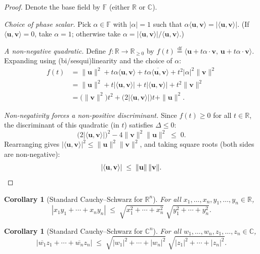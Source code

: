 \documentclass[11pt, a4paper, notitlepage]{report}
\newtheorem{corollary}[theorem]{Corollary}
\theoremstyle{definition}
\theoremstyle{remark}
\begin{document}
\begin{proof}
Denote the base field by $\mathbb{F}$ (either $\mathbb{R}$ or $\mathbb{C}$).

\medskip
\textit{Choice of phase scalar.}
Pick $\alpha \in \mathbb{F}$ with $|\alpha| = 1$ such that $\alpha\langle\mathbf{u},\mathbf{v}\rangle = |\langle\mathbf{u},\mathbf{v}\rangle|$.
(If $\langle\mathbf{u},\mathbf{v}\rangle = 0$, take $\alpha = 1$; otherwise take
$\alpha = |\langle\mathbf{u},\mathbf{v}\rangle|/\langle\mathbf{u},\mathbf{v}\rangle$.)

\medskip
\textit{A non-negative quadratic.}
Define $f : \mathbb{R} \to \mathbb{R}_{\geq 0}$ by
$f(t) \stackrel{\mathrm{df}}{=} \langle\mathbf{u}+t\alpha\cdot\mathbf{v},\,\mathbf{u}+t\alpha\cdot\mathbf{v}\rangle$.
Expanding using (bi/sesqui)linearity and the choice of $\alpha$:
\begin{align*}
  f(t) &= \|\mathbf{u}\|^2 + t\alpha\langle\mathbf{u},\mathbf{v}\rangle
           + t\overline{\alpha\langle\mathbf{u},\mathbf{v}\rangle}
           + t^2|\alpha|^2\|\mathbf{v}\|^2 \\
       &= \|\mathbf{u}\|^2 + t|\langle\mathbf{u},\mathbf{v}\rangle|
           + t|\langle\mathbf{u},\mathbf{v}\rangle|
           + t^2\|\mathbf{v}\|^2 \\
       &= \bigl(\|\mathbf{v}\|^2\bigr)t^2
          + \bigl(2|\langle\mathbf{u},\mathbf{v}\rangle|\bigr)t
          + \|\mathbf{u}\|^2.
\end{align*}

\medskip
\textit{Non-negativity forces a non-positive discriminant.}
Since $f(t) \geq 0$ for all $t \in \mathbb{R}$, the discriminant of this quadratic
(in $t$) satisfies $\Delta \leq 0$:
\[
  \bigl(2|\langle\mathbf{u},\mathbf{v}\rangle|\bigr)^2
  - 4\|\mathbf{v}\|^2\|\mathbf{u}\|^2 \;\leq\; 0.
\]
Rearranging gives $|\langle\mathbf{u},\mathbf{v}\rangle|^2 \leq \|\mathbf{u}\|^2\|\mathbf{v}\|^2$,
and taking square roots (both sides are non-negative):
\[
  |\langle\mathbf{u},\mathbf{v}\rangle| \;\leq\; \|\mathbf{u}\|\,\|\mathbf{v}\|. \qedhere
\]
\end{proof}

\begin{corollary}[Standard Cauchy--Schwarz for $\mathbb{R}^n$]
\label{cor:cs-Rn}
For all $x_1,\ldots,x_n,y_1,\ldots,y_n\in\mathbb{R}$,
\[
  |x_1 y_1 + \cdots + x_n y_n|
  \;\leq\; \sqrt{x_1^2+\cdots+x_n^2}\;\sqrt{y_1^2+\cdots+y_n^2}.
\]
\end{corollary}

\begin{corollary}[Standard Cauchy--Schwarz for $\mathbb{C}^n$]
\label{cor:cs-Cn}
For all $w_1,\ldots,w_n,z_1,\ldots,z_n\in\mathbb{C}$,
\[
  |\overline{w_1}z_1 + \cdots + \overline{w_n}z_n|
  \;\leq\; \sqrt{|w_1|^2+\cdots+|w_n|^2}\;\sqrt{|z_1|^2+\cdots+|z_n|^2}.
\]
\end{corollary}
\end{document}
